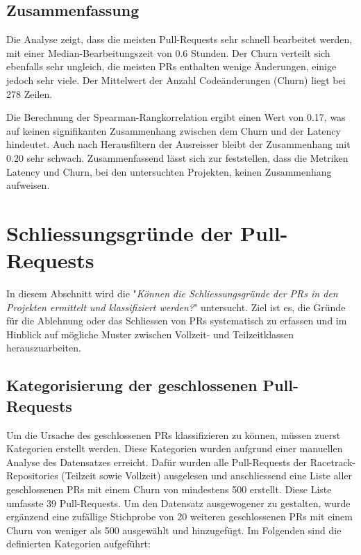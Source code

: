\subsection{Zusammenfassung}
Die Analyse zeigt, dass die meisten Pull-Requests sehr schnell bearbeitet werden, mit einer Median-Bearbeitungszeit von 0.6 Stunden. Der Churn verteilt sich ebenfalls sehr ungleich, die meisten PRs enthalten wenige Änderungen, einige jedoch sehr viele. Der Mittelwert der Anzahl Codeänderungen (Churn) liegt bei 278 Zeilen.

Die Berechnung der Spearman-Rangkorrelation ergibt einen Wert von 0.17, was auf keinen signifikanten Zusammenhang zwischen dem Churn und der Latency hindeutet. Auch nach Herausfiltern der Ausreisser bleibt der Zusammenhang mit 0.20 sehr schwach.
Zusammenfassend lässt sich zur  feststellen, dass die Metriken Latency und Churn, bei den untersuchten Projekten, keinen Zusammenhang aufweisen.

\section{Schliessungsgründe der Pull-Requests}
\label{sec:UntersuchungSchliessgründePRs} 
In diesem Abschnitt wird die  "\textit{Können die Schliessungsgründe der PRs in den Projekten ermittelt und klassifiziert werden?}" untersucht. Ziel ist es, die Gründe für die Ablehnung oder das Schliessen von PRs systematisch zu erfassen und im Hinblick auf  mögliche Muster zwischen Vollzeit- und Teilzeitklassen herauszuarbeiten.

\subsection{Kategorisierung der geschlossenen Pull-Requests}
\label{sec:KategorienGeschlossenePRs} 
Um die Ursache des geschlossenen PRs klassifizieren zu können, müssen zuerst Kategorien erstellt werden. Diese Kategorien wurden aufgrund einer manuellen Analyse des Datensatzes erreicht. 
Dafür wurden alle Pull-Requests der Racetrack-Repositories (Teilzeit sowie Vollzeit) ausgelesen und anschliessend eine Liste aller geschlossenen PRs mit einem Churn von mindestens 500 erstellt. Diese Liste umfasste 39 Pull-Requests. Um den Datensatz ausgewogener zu gestalten, wurde ergänzend eine zufällige Stichprobe von 20 weiteren geschlossenen PRs mit einem Churn von weniger als 500 ausgewählt und hinzugefügt. Im Folgenden sind die definierten Kategorien aufgeführt:

